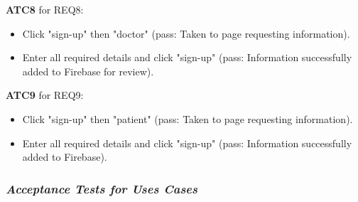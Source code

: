 \documentclass[a4paper]{article}
\begin{document}
\textbf{ATC8} for REQ8:

\begin{itemize}
\item Click "sign-up" then "doctor" (pass: Taken to page requesting information).
\item Enter all required details and click "sign-up" (pass: Information successfully added to Firebase for review).
\end{itemize}

\textbf{ATC9} for REQ9:

\begin{itemize}
\item Click "sign-up" then "patient" (pass: Taken to page requesting information).
\item Enter all required details and click "sign-up" (pass: Information successfully added to Firebase).
\end{itemize}

\subsubsection{\textit{Acceptance Tests for Uses Cases}}

\FloatBarrier
\end{document}
